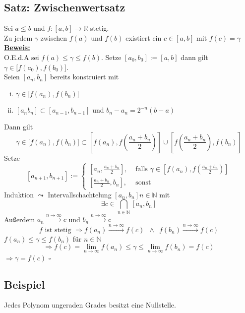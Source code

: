 \subsection{Satz: Zwischenwertsatz} %
\label{sub:satz_zwischenwertsatz}
Sei $a\le b$ und $f: [a,b] \to \mathds{R}$ stetig. \\
Zu jedem $\gamma$ zwischen $f(a)$ und $f(b)$ existiert ein $c \in [a,b]$ mit $f(c)=\gamma$
\vspace{\baselineskip} \\
\underline{\textbf{Beweis:}} \\
O.E.d.A sei $f(a) \le \gamma \le f(b)$. Setze $[a_0 , b_0]:= [a,b]$ dann gilt $\gamma \in \big[f(a_0), f(b_0)\big]$. \\
Seien $[a_n , b_n]$ bereits konstruiert mit 
\begin{enumerate}[(i)]
	\item $\gamma \in \big[ f(a_n), f(b_n)\big]$
	\item $[a_n b_n] \subset [a_{n-1}, b_{n-1}]$ und $b_n -a_n = 2^{-n} (b-a)$
\end{enumerate}
Dann gilt 
\[
	\gamma \in \big[ f(a_n), f(b_n) \big] \subset \left[ f(a_n) , f\left(\frac{a_n +b_n}{2} \right) \right] \cup
	\left[f\left(\frac{a_n +b_n}{2}\right), f(b_n) \right]
\]
Setze
\[
	[a_{n+1}, b_{n+1}] := 
	\begin{cases}
		\left[a_n , \frac{a_n + b_n}{2} \right], &\text{ falls }\gamma \in 
		\left[ f(a_n), f \left( \frac{a_n +b_n}{2} \right) \right]\\
		\left[\frac{a_n + b_n}{2} , b_n\right] , &\text{ sonst}
	\end{cases}
\]
Induktion $\leadsto$ Intervallschachtelung $[a_n , b_n] n \in \mathds{N} $ mit
\[
	\exists c \in \bigcap_{n \in \mathds{N}} [a_n , b_n]
\]
Außerdem $a_n \xrightarrow{n \to \infty} c$ und $b_n  \xrightarrow{n \to \infty} c$
\[
	f  \text{ ist stetig } \Longrightarrow f(a_n) \xrightarrow{n \to \infty} f(c) \enspace \wedge \enspace f(b_n) \xrightarrow{n \to \infty} f(c) 
\]
$f(a_n) \le \gamma \le f(b_n)$ für $n \in \mathds{N}$
\[
	\Rightarrow f(c) = \lim\limits_{n \to \infty} f(a_n) \le \gamma \le \lim\limits_{n \to \infty} f(b_n) = f(c)
\]
$\Rightarrow \gamma = f(c)$ \hfill \( \square \)

\subsection{Beispiel} %
\label{sub:beispiel}
Jedes Polynom ungeraden Grades besitzt eine Nullstelle.

